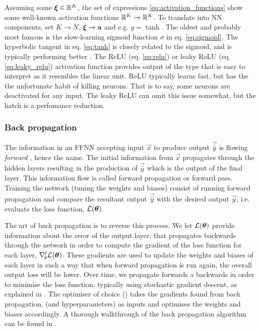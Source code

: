 
    Assuming some $\svec{\xi} \in \RR[K]$, the set of expressions \eqref{eq:activation_functions} show some well-known activation functions $\RR[K] \to \RR[K]$. To translate into NN components, set $K\to N$, $\svec{\xi} \to \vec{a}$ and e.g. $g = \tanh$. 
    The oldest and probably most famous is the slow-learning sigmoid function $\sigma$ in eq. \eqref{eq:sigmoid}. The hyperbolic tangent in eq. \eqref{eq:tanh} is closely related to the sigmoid, and is typically performing better \citep{Goodfellow2016}. The ReLU (eq. \eqref{eq:relu}) or leaky ReLU (eq. \eqref{eq:leaky_relu}) activation function provides output of the type that is easy to interpret as it resembles the linear unit. ReLU typically learns fast, but has the the unfortunate habit of killing neurons. That is to say, some neurons are deactivated for any input. The leaky ReLU can omit this issue somewhat, but the hatch is a perfomance reduction.

    





    \subsubsection{Back propagation}\label{sec:back_propagation}


    The information in an FFNN accepting input $\vec{x}$ to produce output $\vec{\hat{y}}$ is flowing \textit{forward} \citep{Goodfellow2016}, hence the name. The initial information from $\vec{x}$ propagates through the hidden layers resulting in the production of $\vec{\hat{y}}$ which is the output of the final layer. This information flow is called forward propagation or forward pass. Training the network (tuning the weights and biases) consist of running forward propagation and compare the resultant output $\vec{\hat{y}}$ with the desired output $\vec{y}$, i.e. evaluate the loss function, $\mathcal{L}(\svec{\theta})$. 
    

    The art of back propagation is to reverse this process. We let $\mathcal{L}(\svec{\theta})$ provide information about the error of the output layer, that propagates backwards through the network in order to compute the gradient of the loss function for each layer, $\nabla^l_{\!\theta}\mathcal{L}(\svec{\theta})$. These gradients are used to update the weights and biases of each layer in such a way that when forward propagation is run again, the overall output loss will be lower. Over time, we propagate forwards a backwards in order to minimise the loss function, typically using stochastic gradient descent, as explained in . The optimiser of choice () takes the gradients found from back propagation, (and hyperparameters) as inputs and optimises the weights and biases accordingly. A thorough walkthrough of the back propagation algorithm can be found in \citep[chapter 6.5]{Goodfellow2016}.

